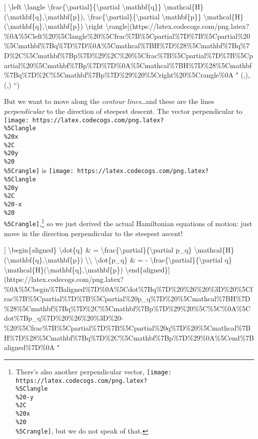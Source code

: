 \documentclass[]{article}
\begin{document}
{[} \textbackslash{}left \textbackslash{}langle
\textbackslash{}frac\{\textbackslash{}partial\}\{\textbackslash{}partial
\textbackslash{}mathbf\{q\}\}
\textbackslash{}mathcal\{H\}(\textbackslash{}mathbf\{q\},\textbackslash{}mathbf\{p\}),
\textbackslash{}frac\{\textbackslash{}partial\}\{\textbackslash{}partial
\textbackslash{}mathbf\{p\}\}
\textbackslash{}mathcal\{H\}(\textbackslash{}mathbf\{q\},\textbackslash{}mathbf\{p\})
\textbackslash{}right
\textbackslash{}rangle{]}(https://latex.codecogs.com/png.latex?\%0A\%5Cleft\%20\%5Clangle\%20\%5Cfrac\%7B\%5Cpartial\%7D\%7B\%5Cpartial\%20\%5Cmathbf\%7Bq\%7D\%7D\%0A\%5Cmathcal\%7BH\%7D\%28\%5Cmathbf\%7Bq\%7D\%2C\%5Cmathbf\%7Bp\%7D\%29\%2C\%20\%5Cfrac\%7B\%5Cpartial\%7D\%7B\%5Cpartial\%20\%5Cmathbf\%7Bp\%7D\%7D\%0A\%5Cmathcal\%7BH\%7D\%28\%5Cmathbf\%7Bq\%7D\%2C\%5Cmathbf\%7Bp\%7D\%29\%20\%5Cright\%20\%5Crangle\%0A
" \left \langle {}
(,), 
(,) \right \rangle
``)

But we want to move along the \emph{contour lines}\ldots{}and these are the
lines \emph{perpendicular} to the direction of steepest descent. The vector
perpendicular to
\texttt{[image: https://latex.codecogs.com/png.latex?\\\%5Clangle\\\%20x\\\%2C\\\%20y\\\%20\\\%5Crangle]}
is
\texttt{[image: https://latex.codecogs.com/png.latex?\\\%5Clangle\\\%20y\\\%2C\\\%20-x\\\%20\\\%5Crangle]},\footnote{There's
  also another perpendicular vector,
  \texttt{[image: https://latex.codecogs.com/png.latex?\\\%5Clangle\\\%20-y\\\%2C\\\%20x\\\%20\\\%5Crangle]},
  but we do not speak of that.} so we just derived the actual Hamiltonian
equations of motion: just move in the direction perpendicular to the steepest
ascent!

{[} \textbackslash{}begin\{aligned\} \textbackslash{}dot\{q\} \& =
\textbackslash{}frac\{\textbackslash{}partial\}\{\textbackslash{}partial p\_q\}
\textbackslash{}mathcal\{H\}(\textbackslash{}mathbf\{q\},\textbackslash{}mathbf\{p\})
\textbackslash{}\textbackslash{} \textbackslash{}dot\{p\_q\} \& = -
\textbackslash{}frac\{\textbackslash{}partial\}\{\textbackslash{}partial q\}
\textbackslash{}mathcal\{H\}(\textbackslash{}mathbf\{q\},\textbackslash{}mathbf\{p\})
\textbackslash{}end\{aligned\}{]}(https://latex.codecogs.com/png.latex?\%0A\%5Cbegin\%7Baligned\%7D\%0A\%5Cdot\%7Bq\%7D\%20\%26\%20\%3D\%20\%5Cfrac\%7B\%5Cpartial\%7D\%7B\%5Cpartial\%20p\_q\%7D\%20\%5Cmathcal\%7BH\%7D\%28\%5Cmathbf\%7Bq\%7D\%2C\%5Cmathbf\%7Bp\%7D\%29\%20\%5C\%5C\%0A\%5Cdot\%7Bp\_q\%7D\%20\%26\%20\%3D\%20-\%20\%5Cfrac\%7B\%5Cpartial\%7D\%7B\%5Cpartial\%20q\%7D\%20\%5Cmathcal\%7BH\%7D\%28\%5Cmathbf\%7Bq\%7D\%2C\%5Cmathbf\%7Bp\%7D\%29\%0A\%5Cend\%7Baligned\%7D\%0A
"
\end{document}
